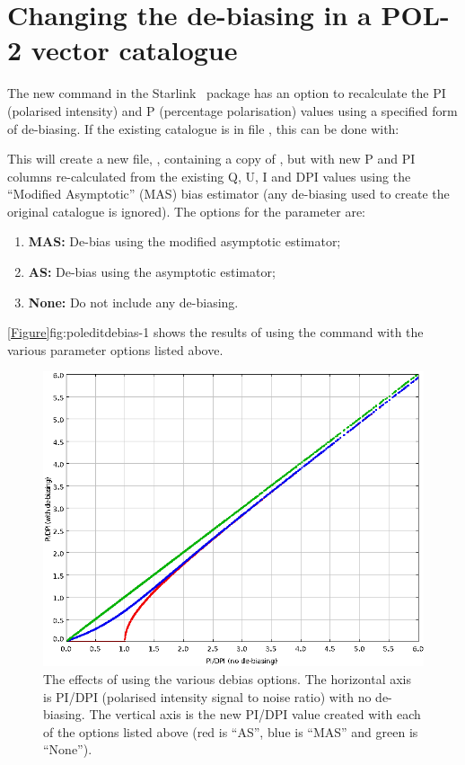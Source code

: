 \section{Changing the de-biasing in a POL-2 vector catalogue}

The new  command in the Starlink \POLPACK\ package has an option to recalculate the PI (polarised intensity) and P (percentage polarisation) values using a specified form of de-biasing. If the existing catalogue is in file , this can be done with:

\begin{terminalv}
\end{terminalv}

This will create a new file, , containing a copy of , but with new P and PI columns re-calculated from the existing Q, U, I and DPI values using the ``Modified Asymptotic'' (MAS) bias estimator (any de-biasing used to create the original catalogue is ignored). The options for the  parameter are:

\begin{enumerate}
\item {\bf MAS:} De-bias using the modified asymptotic estimator;
\item {\bf AS:} De-bias using the asymptotic estimator;
\item {\bf None:} Do not include any de-biasing.
\end{enumerate}

\cref{Figure}{fig:poleditdebias-1}{} shows the results of using the  command with the various   parameter options listed above.

\begin{figure}[ht!]
\begin{center}
\includegraphics[width=0.46\linewidth]{sc22-poledit-debias.png}
\caption [The effects of using the various  debias options]{
  The effects of using the various  debias options. The horizontal axis is PI/DPI (polarised intensity signal to noise ratio) with no de-biasing. The vertical axis is the new PI/DPI value created with each of the  options listed above (red is ``AS'', blue is ``MAS'' and green is ``None'').
\label{fig:poleditdebias-1}
}
\end{center}
\end{figure}


